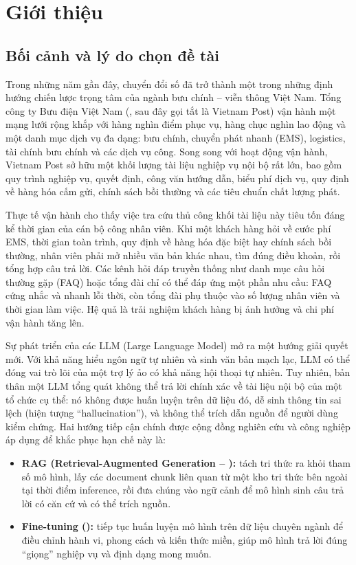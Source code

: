 \chapter{Giới thiệu}
\label{ch:gioithieu}

\section{Bối cảnh và lý do chọn đề tài}

Trong những năm gần đây, chuyển đổi số đã trở thành một trong những định hướng
chiến lược trọng tâm của ngành bưu chính -- viễn thông Việt Nam. Tổng công ty Bưu
điện Việt Nam (\vnpost, sau đây gọi tắt là Vietnam Post) vận hành một mạng lưới rộng khắp
với hàng nghìn điểm phục vụ, hàng chục nghìn lao động và một danh mục dịch vụ đa
dạng: bưu chính, chuyển phát nhanh (EMS), logistics, tài chính bưu chính và các dịch
vụ công. Song song với hoạt động vận hành, Vietnam Post sở hữu một khối lượng tài liệu
nghiệp vụ nội bộ rất lớn, bao gồm quy trình nghiệp vụ, quyết định, công văn hướng dẫn,
biểu phí dịch vụ, quy định về hàng hóa cấm gửi, chính sách bồi thường và các tiêu chuẩn
chất lượng phát.

Thực tế vận hành cho thấy việc tra cứu thủ công khối tài liệu này tiêu tốn đáng kể thời
gian của cán bộ công nhân viên. Khi một khách hàng hỏi về cước phí EMS, thời gian toàn
trình, quy định về hàng hóa đặc biệt hay chính sách bồi thường, nhân viên phải mở nhiều
văn bản khác nhau, tìm đúng điều khoản, rồi tổng hợp câu trả lời. Các kênh hỏi đáp
truyền thống như danh mục câu hỏi thường gặp (FAQ) hoặc tổng đài chỉ có thể đáp ứng một
phần nhu cầu: FAQ cứng nhắc và nhanh lỗi thời, còn tổng đài phụ thuộc vào số lượng nhân
viên và thời gian làm việc. Hệ quả là trải nghiệm khách hàng bị ảnh hưởng và chi phí
vận hành tăng lên.

Sự phát triển của các LLM (Large Language Model) mở ra một
hướng giải quyết mới. Với khả năng hiểu ngôn ngữ tự nhiên và sinh văn bản mạch lạc,
LLM có thể đóng vai trò lõi của một trợ lý ảo có khả năng hội thoại tự nhiên. Tuy
nhiên, bản thân một LLM tổng quát không thể trả lời chính xác về tài liệu nội bộ của
một tổ chức cụ thể: nó không được huấn luyện trên dữ liệu đó, dễ sinh thông tin sai
lệch (hiện tượng ``hallucination''), và không thể trích dẫn nguồn để người dùng kiểm chứng.
Hai hướng tiếp cận chính được cộng đồng nghiên cứu và công nghiệp áp dụng để khắc phục
hạn chế này là:

\begin{itemize}
  \item \textbf{RAG (Retrieval-Augmented Generation -- \rag):}
  tách tri thức ra khỏi tham số mô hình, lấy các document chunk liên quan từ một
  kho tri thức bên ngoài tại thời điểm inference, rồi đưa chúng vào ngữ cảnh để mô hình
  sinh câu trả lời có căn cứ và có thể trích nguồn.
  \item \textbf{Fine-tuning (\ft):} tiếp tục huấn luyện mô hình trên dữ liệu chuyên ngành
  để điều chỉnh hành vi, phong cách và kiến thức miền, giúp mô hình trả lời đúng ``giọng''
  nghiệp vụ và định dạng mong muốn.
\end{itemize}

